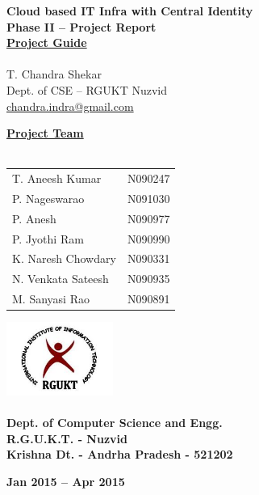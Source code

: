 \documentclass[12pt]{report}
\begin{document}
\begin{titlepage}
 \begin{center}
\LARGE
\textbf{Cloud based IT Infra with Central Identity} \\
\vfill
\textbf{Phase II -- Project Report }\\
\vfill
\Large
\underline{\textbf{Project Guide }} \\ 
\large
\underline{} \\
T. Chandra Shekar \\
\small
Dept. of CSE -- RGUKT Nuzvid \\
\small
\url{chandra.indra@gmail.com}
\vfill

\Large
\textbf{\underline{ Project Team } } \\
\underline{} \\
\large
\begin{tabular}{l  l}
T. Aneesh Kumar & N090247  \\
P. Nageswarao  & N091030  \\
P. Anesh  & N090977  \\
P. Jyothi Ram & N090990  \\
K. Naresh Chowdary  & N090331  \\
N. Venkata Sateesh  & N090935  \\
M. Sanyasi Rao & N090891 
\end{tabular}

\vfill


\includegraphics[width=3.5cm]{rgukt_logo.jpg} 
\Large
\underline{} \\
\underline{} \\
\normalsize
\textbf{Dept. of Computer Science and Engg. } \\
\textbf{R.G.U.K.T. - Nuzvid } \\
\textbf{Krishna Dt. - Andrha Pradesh - 521202}


\normalsize
\vfill
%
%

\textbf{Jan 2015 -- Apr 2015 }

\end{center}
\end{titlepage}
\end{document}
